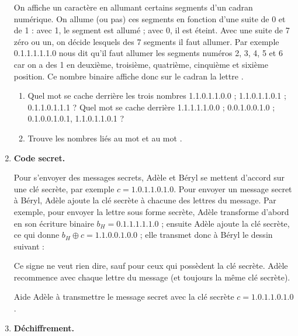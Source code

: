 \documentclass[class=report,crop=false, 12pt]{standalone}
\begin{document}
\begin{activite}
\begin{enumerate}
On affiche un caractère en allumant certains segments d'un cadran numérique. On allume (ou pas) ces segments en fonction d'une suite de 0 et de 1 : avec 1, le segment est allumé ; avec 0, il est éteint. Avec une suite de 7 zéro ou un, on décide lesquels des 7 segments il faut allumer. Par exemple 0.1.1.1.1.1.0 nous dit qu'il faut allumer les segments numéros 2, 3, 4, 5 et 6 car on a des 1 en deuxième, troisième, quatrième, cinquième et sixième position. Ce nombre binaire affiche donc sur le cadran la lettre .





  \begin{enumerate}
    \item Quel mot se cache derrière les trois nombres 1.1.0.1.1.0.0 ; 1.1.0.1.1.0.1 ; 0.1.1.0.1.1.1 ? Quel mot se cache derrière 1.1.1.1.1.0.0 ; 0.0.1.0.0.1.0 ; 0.1.0.0.1.0.1, 1.1.0.1.1.0.1 ?

     
    \item Trouve les nombres liés au mot  et au mot . 


   
    
  \end{enumerate}  
  
  \item \textbf{Code secret.}
   
Pour s'envoyer des messages secrets, Adèle et Béryl se mettent d'accord sur une clé secrète, par exemple $c = 1.0.1.1.0.1.0$. Pour envoyer un message secret à Béryl, Adèle ajoute la clé secrète à chacune des lettres du message. Par exemple, pour envoyer la lettre  sous forme secrète, Adèle transforme d'abord  en son écriture binaire $b_H = 0.1.1.1.1.1.0$ ; ensuite Adèle ajoute la clé secrète, ce qui donne $b_H \oplus c = 1.1.0.0.1.0.0$ ; elle transmet donc à Béryl le dessin suivant : 

   
Ce signe ne veut rien dire, sauf pour ceux qui possèdent la clé secrète. Adèle recommence avec chaque lettre du message (et toujours la même clé secrète).

    Aide Adèle à transmettre le message secret  avec la clé secrète $c = 1.0.1.1.0.1.0$.


  \item \textbf{Déchiffrement.}
  

\end{enumerate}
\end{activite}
\end{document}
